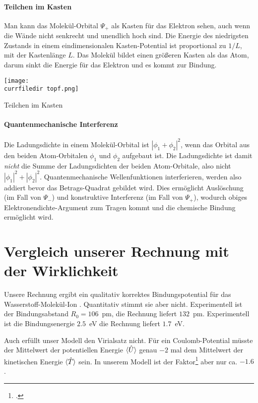 \paragraph{Teilchen im Kasten}  Man kann das Molekül-Orbital $\Psi_+$ als Kasten für das Elektron sehen, auch wenn die Wände nicht senkrecht und unendlich hoch sind. Die Energie des niedrigsten Zustands in einem eindimensionalen  Kasten-Potential ist proportional zu $1/L$, mit der Kastenlänge $L$. Das Molekül bildet einen größeren Kasten als das Atom, darum sinkt die Energie für das Elektron und es kommt zur Bindung.
%
\begin{marginfigure}
\texttt{[image: \\currfiledir topf.png]}
\caption{Teilchen im Kasten}
\end{marginfigure}

\paragraph{Quantenmechanische Interferenz} Die Ladungsdichte in einem Molekül-Orbital ist $| \phi_1 + \phi_2 |^2$, wenn das Orbital aus den beiden Atom-Orbitalen $\phi_1$ und $\phi_2$ aufgebaut ist. Die Ladungsdichte ist damit \emph{nicht} die Summe der Ladungsdichten der beiden Atom-Orbitale, also nicht $| \phi_1 |^2 +| \phi_2 |^2$. Quantenmechanische Wellenfunktionen interferieren, werden also addiert bevor das Betrags-Quadrat gebildet wird. Dies ermöglicht Auslöschung (im Fall von $\Psi_-$) und konstruktive Interferenz (im Fall von $\Psi_+$), wodurch obiges Elektronendichte-Argument zum Tragen kommt und  die chemische Bindung ermöglicht wird.


\section{Vergleich unserer Rechnung mit der Wirklichkeit}

Unsere Rechnung ergibt ein qualitativ korrektes Bindungspotential für das  Wasserstoff-Molekül-Ion  . Quantitativ stimmt sie aber nicht. Experimentell ist der Bindungsabstand $R_0 = 106$~pm, die Rechnung liefert $132$~pm. Experimentell ist die Bindungsenergie $2.5$~eV die Rechnung liefert $1.7$~eV.

Auch erfüllt unser Modell den Virialsatz nicht. Für ein Coulomb-Potential müsste der Mittelwert der potentiellen Energie $\braket{\hat{U}}$ genau $-2$ mal dem Mittelwert der kinetischen  Energie $\braket{\hat{T}}$ sein. In unserem Modell ist der Faktor\footcite{McQuarrie2008} aber nur ca. $-1.6$.

